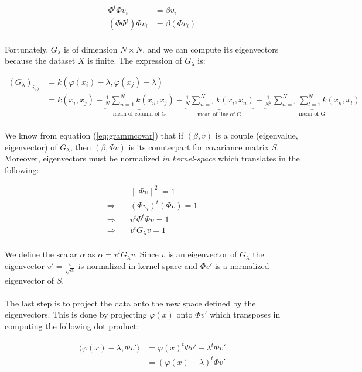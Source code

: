 \begin{align}\label{eq:grammcovar}
\Phi^t\Phi v_i &= \beta v_i \\
(\Phi\Phi^t)\Phi v_i &= \beta (\Phi v_i)
\end{align}

\paragraph{} Fortunately, $G_\lambda$ is of dimension $N \times N$, and we can compute its
eigenvectors because the dataset $X$ is finite. The expression of $G_\lambda$ is:

\begin{align*}
(G_\lambda)_{i, j} &= k\left(\varphi(x_i) - \lambda, \varphi(x_j) - \lambda\right) \\
&= k(x_i, x_j) - \underbrace{\frac{1}{N}\sum_{n = 1}^N k(x_n, x_j)}_{\text{mean of column of G}} - \underbrace{\frac{1}{N}\sum_{n = 1}^N k(x_i, x_n)}_{\text{mean of line of G}} + \underbrace{\frac{1}{N^2}\sum_{n = 1}^{N}\sum_{l = 1}^{N} k(x_n, x_l)}_{\text{mean of G}}
\end{align*}

\paragraph{} We know from equation (\ref{eq:grammcovar}) that if $(\beta, v)$ is a couple (eigenvalue, eigenvector) of $G_\lambda$, then $(\beta, \Phi v)$ is its counterpart for covariance matrix
$S$. Moreover, eigenvectors must be normalized \emph{in kernel-space} which translates in the
following:

\begin{align*}
&\| \Phi v \|^2 = 1 \\
\Rightarrow\quad &(\Phi v_i)^t(\Phi v) = 1 \\
\Rightarrow\quad &v^t\Phi^t\Phi v = 1 \\
\Rightarrow\quad &v^t G_\lambda v = 1
\end{align*}

\paragraph{} We define the scalar $\alpha$ as $\alpha = v^t G_\lambda v$. Since $v$ is an eigenvector
of $G_\lambda$ the eigenvector $v' = \frac{v}{\sqrt{\alpha}}$ is normalized in kernel-space and $\Phi
v'$ is a normalized eigenvector of $S$.


\paragraph{} The last step is to project the data onto the new space defined by the eigenvectors.
This is done by projecting $\varphi(x)$ onto $\Phi v'$ which transposes in computing the following
dot product:

\begin{align*}
\langle\varphi(x) - \lambda, \Phi v'\rangle &= \varphi(x)^t\Phi v' - \lambda^t\Phi v' \\
&= (\varphi(x) - \lambda)^t\Phi v'
\end{align*}
